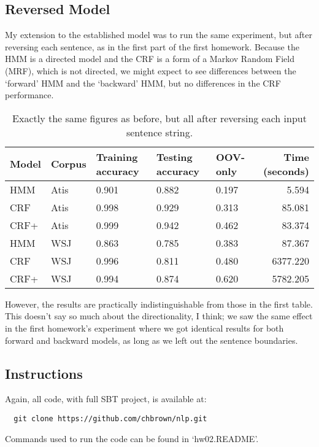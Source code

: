 \documentclass[10pt]{article}\usepackage{graphicx, color}
\begin{document}
\subsection{Reversed Model}

My extension to the established model was to run the same experiment, but after reversing each sentence, as in the first part of the first homework.
Because the HMM is a directed model and the CRF is a form of a Markov Random Field (MRF), which is not directed, we might expect to see differences between the `forward' HMM and the `backward' HMM, but no differences in the CRF performance.




\begin{table}[H]
  \centering
  \begin{tabular}{lllllr}
    Model & Corpus & Training accuracy & Testing accuracy & OOV-only & Time (seconds) \\
    \midrule
    HMM   & Atis & 0.901 & 0.882 &
      0.197 & 5.594 \\
    CRF   & Atis & 0.998 & 0.929 &
      0.313 & 85.081 \\
    CRF+ & Atis & 0.999 & 0.942 &
      0.462 & 83.374 \\
    \midrule
    HMM   & WSJ & 0.863 & 0.785 &
      0.383 & 87.367 \\
    CRF   & WSJ & 0.996 & 0.811 &
      0.480 & 6377.220 \\
    CRF+ & WSJ & 0.994 & 0.874 &
      0.620 & 5782.205 \\
  \end{tabular}
  \caption{Exactly the same figures as before, but all after reversing each input sentence string.}
  \label{table:2}
\end{table}
However, the results are practically indistinguishable from those in the first table. This doesn't say so much about the directionality, I think; we saw the same effect in the first homework's experiment where we got identical results for both forward and backward models, as long as we left out the sentence boundaries.

\subsection{Instructions}

Again, all code, with full SBT project, is available at:
\begin{lstlisting}
  git clone https://github.com/chbrown/nlp.git
\end{lstlisting}
Commands used to run the code can be found in `hw02.README'.
\end{document}
